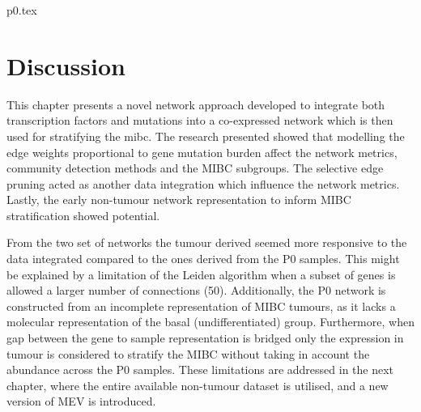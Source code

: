 {p0.tex}




\section{Discussion}


This chapter presents a novel network approach developed to integrate both transcription factors and mutations into a co-expressed network which is then used for stratifying the \acrlong{mibc}. The research presented showed that modelling the edge weights proportional to gene mutation burden affect the network metrics, community detection methods and the MIBC subgroups. The selective edge pruning  acted as another data integration which influence the network metrics. Lastly, the early non-tumour network representation to inform MIBC stratification showed potential.

From the two set of networks the tumour derived seemed more responsive to the data integrated compared to the ones derived from the P0 samples. This might be explained by a limitation of the Leiden algorithm when a subset of genes is allowed a larger number of connections (50). Additionally, the P0 network is constructed from an incomplete representation of MIBC tumours, as it lacks a molecular representation of the basal (undifferentiated) group. Furthermore, when gap between the gene to sample representation is bridged only the expression in tumour is considered to stratify the MIBC without taking in account the abundance across the P0 samples. These limitations are addressed in the next chapter, where the entire available non-tumour dataset is utilised, and a new version of MEV is introduced.


